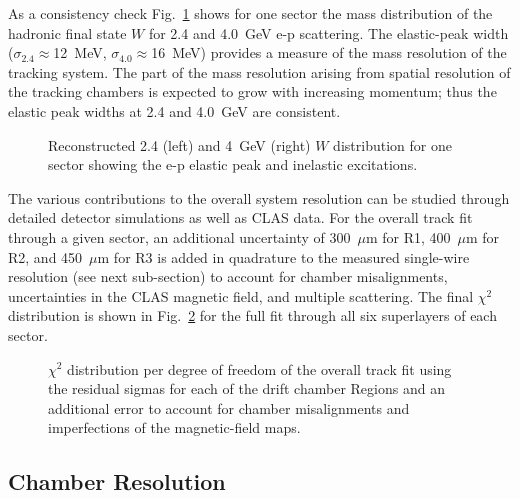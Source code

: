As a consistency check Fig.~\ref{elastic} shows for one sector the mass 
distribution of the hadronic final state $W$ for 2.4 and 4.0~GeV e-p scattering.
The elastic-peak width ($\sigma_{2.4} \approx$12~MeV, $\sigma_{4.0} 
\approx$16~MeV) provides a measure of the mass resolution of the tracking system.
The part of the mass resolution arising from spatial resolution of the tracking
chambers is expected to grow with increasing momentum; thus the
elastic peak widths at 2.4 and 4.0~GeV are consistent.

\begin{figure}[htpb]
\vspace{5.5cm} 
\caption{\small{Reconstructed 2.4 (left) and 4~GeV (right) $W$ distribution for 
one sector showing the e-p elastic peak and inelastic excitations.}}
\label{elastic}
\end{figure}


The various contributions to the overall system resolution can be studied
through detailed detector simulations as well as CLAS data.  For the overall
track fit through a given sector, an additional uncertainty of 300~$\mu$m for 
R1, 400~$\mu$m for R2, and 450~$\mu$m for R3 is added in quadrature to the
measured single-wire resolution (see next sub-section) to account for chamber 
misalignments, uncertainties in the CLAS magnetic field, and multiple scattering.
The final $\chi^2$ distribution is shown in Fig.~\ref{chi2fit} for the 
full fit through all six superlayers of each sector.


\begin{figure}[htpb]
\vspace{5cm} 
\caption{\small{$\chi^2$ distribution per degree of freedom of the overall track 
fit using the residual sigmas for each of the drift chamber Regions and an 
additional error to account for chamber misalignments and imperfections of the
magnetic-field maps.}}
\label{chi2fit}
\end{figure}

\subsection{Chamber Resolution}

